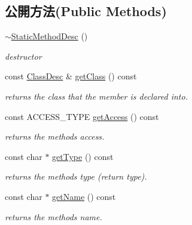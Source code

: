 \subsection*{公開方法(Public Methods)}
\begin{DoxyCompactItemize}
\item 
\hyperlink{classagm_1_1reflection_1_1_static_method_desc_a5f17e2b9fd2f950a5589680270568d7f}{$\sim$\+Static\+Method\+Desc} ()\hypertarget{classagm_1_1reflection_1_1_static_method_desc_a5f17e2b9fd2f950a5589680270568d7f}{}\label{classagm_1_1reflection_1_1_static_method_desc_a5f17e2b9fd2f950a5589680270568d7f}

\begin{DoxyCompactList}\small\item\em destructor \end{DoxyCompactList}\item 
const \hyperlink{classagm_1_1reflection_1_1_class_desc}{Class\+Desc} \& \hyperlink{classagm_1_1reflection_1_1_static_method_desc_aa5f9535bb7e48f720068f98fd85c7415}{get\+Class} () const 
\begin{DoxyCompactList}\small\item\em returns the class that the member is declared into. \end{DoxyCompactList}\item 
const A\+C\+C\+E\+S\+S\+\_\+\+T\+Y\+PE \hyperlink{classagm_1_1reflection_1_1_static_method_desc_a6ad2754ed4cd56c0bd7e28bb752165f8}{get\+Access} () const 
\begin{DoxyCompactList}\small\item\em returns the method\textquotesingle{}s access. \end{DoxyCompactList}\item 
const char $\ast$ \hyperlink{classagm_1_1reflection_1_1_static_method_desc_ac2e3243b8073852709d8165480f15f21}{get\+Type} () const 
\begin{DoxyCompactList}\small\item\em returns the method\textquotesingle{}s type (return type). \end{DoxyCompactList}\item 
const char $\ast$ \hyperlink{classagm_1_1reflection_1_1_static_method_desc_a5cc36537811cebc442a06db87a3a289c}{get\+Name} () const 
\begin{DoxyCompactList}\small\item\em returns the method\textquotesingle{}s name. \end{DoxyCompactList}\item 

\end{DoxyCompactItemize}
